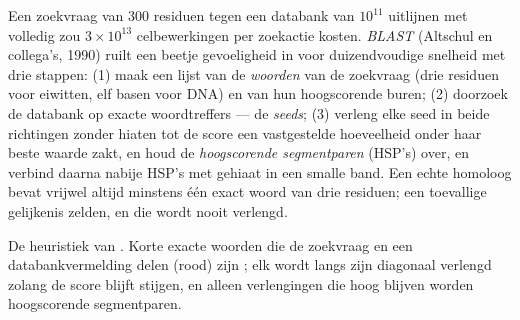 \begin{definition}[BLAST]\label{def:b3:bioinformatics:blast}
Een zoekvraag van \num{300} residuen tegen een databank van $10^{11}$
uitlijnen met volledig  zou $3\times 10^{13}$
celbewerkingen per zoekactie kosten. \emph{BLAST} (Altschul en
collega's, 1990) ruilt een beetje gevoeligheid in voor duizendvoudige
snelheid met drie stappen: (1) maak een lijst van de \emph{woorden} van
de zoekvraag (drie residuen voor eiwitten, elf basen voor DNA) en van
hun hoogscorende buren; (2) doorzoek de databank op exacte
woordtreffers --- de \emph{seeds}; (3) verleng elke seed in beide
richtingen zonder hiaten tot de score een vastgestelde hoeveelheid
onder haar beste waarde zakt, en houd de \emph{hoogscorende
segmentparen} (HSP's) over, en verbind daarna nabije HSP's met gehiaat
 in een smalle band. Een echte homoloog bevat
vrijwel altijd minstens één exact woord van drie residuen; een
toevallige gelijkenis zelden, en die wordt nooit verlengd.
\end{definition}

\begin{omfigure}

{\small De heuristiek van . Korte exacte woorden die de zoekvraag
en een databankvermelding delen (rood) zijn ; elk wordt langs zijn
diagonaal verlengd zolang de score blijft stijgen, en alleen
verlengingen die hoog blijven worden hoogscorende segmentparen.}
\end{omfigure}

